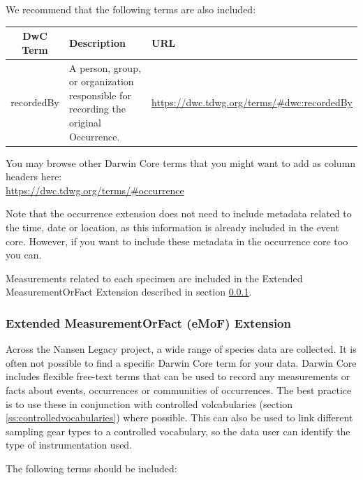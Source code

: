 \documentclass[a4paper,english, 11pt]{article}
\begin{document}
We recommend that the following terms are also included:

\begin{center}
\begin{tabular}{ |c|p{}|p{}| } 
\hline
DwC Term & Description & URL \\
\hline
recordedBy & A person, group, or organization responsible for recording the original Occurrence. & \url{https://dwc.tdwg.org/terms/#dwc:recordedBy} \\
\hline
\end{tabular}
\end{center}

You may browse other Darwin Core terms that you might want to add as column headers here:\\
\url{https://dwc.tdwg.org/terms/#occurrence}

Note that the occurrence extension does not need to include metadata related to the time, date or location, as this information is already included in the event core. However, if you want to include these metadata in the occurrence core too you can.

Measurements related to each specimen are included in the Extended MeasurementOrFact Extension described in section \ref{ss:emofextension}.

\subsubsection{Extended MeasurementOrFact (eMoF) Extension}
\label{ss:emofextension}

Across the Nansen Legacy project, a wide range of species data are collected. It is often not possible to find a specific Darwin Core term for your data. Darwin Core includes flexible free-text terms that can be used to record any measurements or facts about events, occurrences or communities of occurrences. The best practice is to use these in conjunction with controlled volcabularies (section \ref{ss:controlledvocabularies}) where possible. This can also be used to link different sampling gear types to a controlled vocabulary, so the data user can identify the type of instrumentation used.

The following terms should be included:
\end{document}
